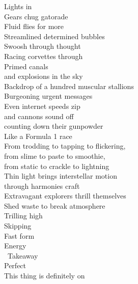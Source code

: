 Lights in\\
Gears chug gatorade\\
Fluid flies for more\\
Streamlined determined bubbles\\
Swoosh through thought\\
Racing corvettes through\\
Primed canals\\
and explosions in the sky\\

Backdrop of a hundred muscular stallions\\
Burgeoning urgent messages\\
Even internet speeds zip\\
and cannons sound off\\
counting down their gunpowder\\
Like a Formula 1 race\\
From trodding to tapping to flickering,\\
from slime to paste to smoothie,\\
from static to crackle to lightning\\

Thin light brings interstellar motion\\
through harmonies craft\\
Extravagant explorers thrill themselves\\
Shed waste to break atmosphere\\

Trilling high\\
Skipping\\
Fast form\\
Energy\\\
Takeaway\\
Perfect\\

This thing is definitely on\\

